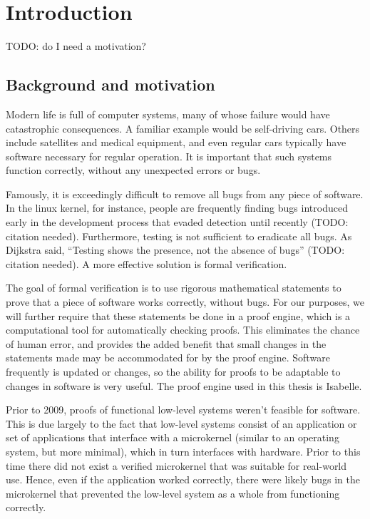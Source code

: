 \documentclass[twoside]{memoir}
\begin{document}
\tableofcontents


\mainmatter

\chapter{Introduction}

TODO: do I need a motivation?

\section{Background and motivation}

Modern life is full of computer systems,
many of whose failure would have catastrophic consequences.
A familiar example would be self-driving cars.
Others include satellites and medical equipment, and even regular cars
typically have software necessary for regular operation.
It is important that such systems function correctly, without any
unexpected errors or bugs.

Famously, it is exceedingly difficult to remove all bugs
from any piece of software.
In the linux kernel, for instance, people are frequently finding bugs
introduced early in the development process that evaded detection until recently
(TODO: citation needed).
Furthermore, testing is not sufficient to eradicate all bugs.
As Dijkstra said, ``Testing shows the presence, not the absence of bugs''
(TODO: citation needed).
A more effective solution is formal verification.

The goal of formal verification is to use rigorous mathematical statements
to prove that a piece of software works correctly, without bugs.
For our purposes, we will further require that these statements be
done in a proof engine, which is a computational tool for 
automatically checking proofs.
This eliminates the chance of human error,
and provides the added benefit that small changes in the statements made
may be accommodated for by the proof engine.
Software frequently is updated or changes, so the ability for proofs
to be adaptable to changes in software is very useful.
The proof engine used in this thesis is Isabelle.

Prior to 2009, proofs of functional low-level systems weren't
feasible for software.
This is due largely to the fact that low-level systems consist of
an application or set of applications that interface with
a microkernel (similar to an operating system, but more minimal),
which in turn interfaces with hardware.
Prior to this time there did not exist a verified microkernel
that was suitable for real-world use.
Hence, even if the application worked correctly,
there were likely bugs in the microkernel that prevented the low-level system
as a whole from functioning correctly.
\end{document}
